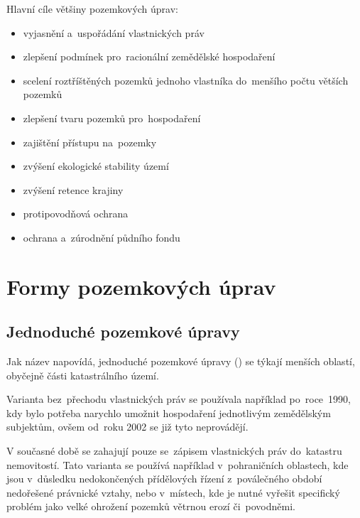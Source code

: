 Hlavní cíle většiny pozemkových úprav:
\vspace{-\topsep}
	\begin{itemize}[leftmargin=1.5cm, noitemsep]
		\item vyjasnění a~uspořádání vlastnických práv
		\item zlepšení podmínek pro~racionální zemědělské hospodaření
		\item scelení roztříštěných pozemků jednoho vlastníka do~menšího počtu větších pozemků
		\item zlepšení tvaru pozemků pro~hospodaření
		\item zajištění přístupu na~pozemky
		\item zvýšení ekologické stability území
		\item zvýšení retence krajiny
		\item protipovodňová ochrana
		\item ochrana a~zúrodnění půdního fondu
	\end{itemize}

\section{Formy pozemkových úprav}
\label{formy_pu}

\subsection{Jednoduché pozemkové úpravy}
\label{jednoduche_pu}

Jak název napovídá, jednoduché pozemkové úpravy () se týkají
menších oblastí, obyčejně části katastrálního území.

Varianta  bez~přechodu vlastnických práv se používala
například po~ro\-ce~1990, kdy bylo potřeba narychlo umožnit
hospodaření jednotlivým zemědělským subjektům, ovšem od~roku 2002 se
již tyto  neprovádějí.

V současné době se zahajují pouze  se~zápisem vlastnických
práv do~kata\-stru nemovitostí. Tato varianta  se používá
například v~pohraničních oblastech, kde jsou v~důsledku nedokončených
přídělových řízení z~poválečného období nedořešené právnické vztahy,
nebo v~místech, kde je nutné vyřešit specifický problém jako velké
ohrožení pozemků větrnou erozí či~povodněmi.

